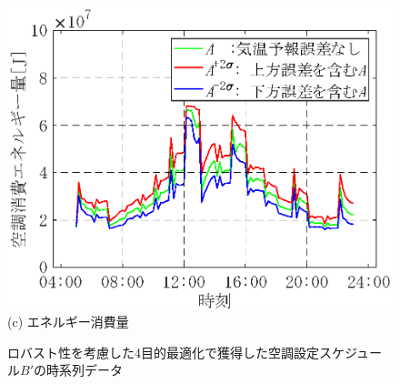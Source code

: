 \begin{figure}[htbp]
\begin{center}
\begin{minipage}{0.5\textwidth}
\begin{center}
            \end{center}
        \end{minipage}
        \begin{minipage}{0.5\textwidth}
            \begin{center}
                \includegraphics[width=1\textwidth,keepaspectratio=true]{fig/robust_result_schedule_4obj_power.eps}\\(c) エネルギー消費量
            \end{center}
        \end{minipage}
        \caption{ロバスト性を考慮した4目的最適化で獲得した空調設定スケジュール$B'$の時系列データ}
        \label{fig::robust_result_schedule_4obj}
    \end{center}
\end{figure}

